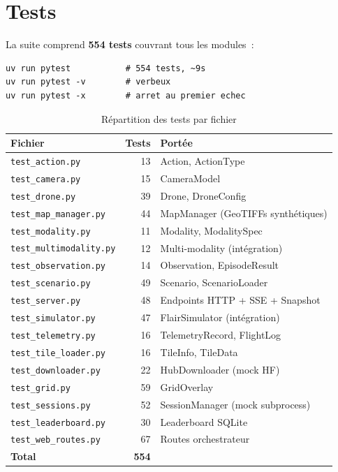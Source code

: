 \documentclass[a4paper, 11pt, french]{article}
\newcommand{\code}[1]{\texttt{#1}}
\begin{document}
\section{Tests}
\label{sec:tests}

La suite comprend \textbf{554 tests} couvrant tous les modules~:

\begin{lstlisting}[style=bash]
uv run pytest           # 554 tests, ~9s
uv run pytest -v        # verbeux
uv run pytest -x        # arret au premier echec
\end{lstlisting}

\begin{table}[H]
\centering\small
\begin{tabular}{lrl}
\toprule
\textbf{Fichier} & \textbf{Tests} & \textbf{Portée} \\
\midrule
\code{test\_action.py}         & 13 & Action, ActionType \\
\code{test\_camera.py}         & 15 & CameraModel \\
\code{test\_drone.py}          & 39 & Drone, DroneConfig \\
\code{test\_map\_manager.py}   & 44 & MapManager (GeoTIFFs synthétiques) \\
\code{test\_modality.py}       & 11 & Modality, ModalitySpec \\
\code{test\_multimodality.py}  & 12 & Multi-modality (intégration) \\
\code{test\_observation.py}    & 14 & Observation, EpisodeResult \\
\code{test\_scenario.py}       & 49 & Scenario, ScenarioLoader \\
\code{test\_server.py}         & 48 & Endpoints HTTP + SSE + Snapshot \\
\code{test\_simulator.py}      & 47 & FlairSimulator (intégration) \\
\code{test\_telemetry.py}      & 16 & TelemetryRecord, FlightLog \\
\code{test\_tile\_loader.py}   & 16 & TileInfo, TileData \\
\code{test\_downloader.py}     & 22 & HubDownloader (mock HF) \\
\code{test\_grid.py}           & 59 & GridOverlay \\
\code{test\_sessions.py}       & 52 & SessionManager (mock subprocess) \\
\code{test\_leaderboard.py}    & 30 & Leaderboard SQLite \\
\code{test\_web\_routes.py}    & 67 & Routes orchestrateur \\
\midrule
\textbf{Total}                 & \textbf{554} & \\
\bottomrule
\end{tabular}
\caption{Répartition des tests par fichier}
\end{table}
\end{document}
